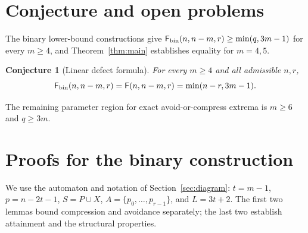 \documentclass[11pt]{article}
\theoremstyle{definition}
\theoremstyle{plain}
\newtheorem{conjecture}[theorem]{Conjecture}
\newcommand{\Max}{\mathsf F}
\begin{document}
\section{Conjecture and open problems}\label{sec:conj}
The binary lower-bound constructions give
$\Max_{\rm bin}(n,n-m,r)\ge\min(q,3m-1)$ for every $m\ge4$,
and Theorem~\ref{thm:main} establishes equality for $m=4,5$.
\begin{conjecture}[Linear defect formula]\label{conj:linear}
For every $m\ge4$ and all admissible $n,r$,
\[
 \Max_{\rm bin}(n,n-m,r)=\Max(n,n-m,r)=\min(n-r,3m-1).
\]
\end{conjecture}
The remaining parameter region for exact avoid-or-compress extrema
is $m\ge6$ and $q\ge3m$.


\appendix
\section{Proofs for the binary construction}\label{app:binary-construction}
We use the automaton and notation of Section~\ref{sec:diagram}:
$t=m-1$, $p=n-2t-1$, $S=P\cup X$, $A=\{p_0,\ldots,p_{r-1}\}$,
and $L=3t+2$. The first two lemmas bound compression and avoidance
separately; the last two establish attainment and the structural properties.
\end{document}
